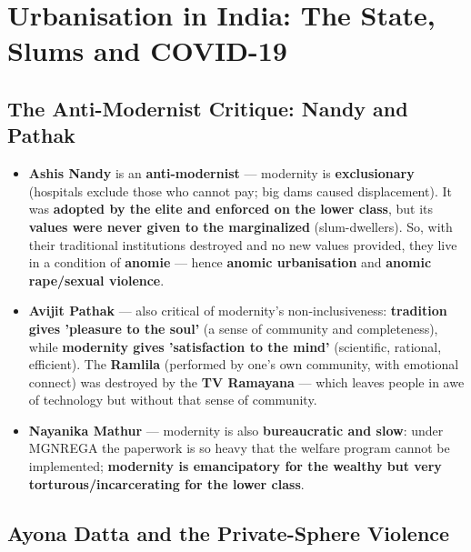 \chapter{Urbanisation in India: The State, Slums and COVID-19}

\section{The Anti-Modernist Critique: Nandy and Pathak}

\begin{KeyConcept}
\begin{itemize}
\item \textbf{Ashis Nandy} is an \textbf{anti-modernist} --- modernity is \textbf{exclusionary} (hospitals exclude those who cannot pay; big dams caused displacement). It was \textbf{adopted by the elite and enforced on the lower class}, but its \textbf{values were never given to the marginalized} (slum-dwellers). So, with their traditional institutions destroyed and no new values provided, they live in a condition of \textbf{anomie} --- hence \textbf{anomic urbanisation} and \textbf{anomic rape/sexual violence}.
\item \textbf{Avijit Pathak} --- also critical of modernity's non-inclusiveness: \textbf{tradition gives 'pleasure to the soul'} (a sense of community and completeness), while \textbf{modernity gives 'satisfaction to the mind'} (scientific, rational, efficient). The \textbf{Ramlila} (performed by one's own community, with emotional connect) was destroyed by the \textbf{TV Ramayana} --- which leaves people in awe of technology but without that sense of community.
\item \textbf{Nayanika Mathur} --- modernity is also \textbf{bureaucratic and slow}: under MGNREGA the paperwork is so heavy that the welfare program cannot be implemented; \textbf{modernity is emancipatory for the wealthy but very torturous/incarcerating for the lower class}.
\end{itemize}
\end{KeyConcept}

\section{Ayona Datta and the Private-Sphere Violence}

